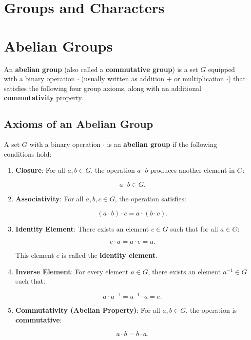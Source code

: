 \documentclass[11pt]{article}
\theoremstyle{definition}
\begin{document}
\section*{Groups and Characters}

\section{Abelian Groups}

An \textbf{abelian group} (also called a \textbf{commutative group}) is a set \( G \) equipped with a binary operation \( \cdot \) (usually written as addition \( + \) or multiplication \( \cdot \)) that satisfies the following four group axioms, along with an additional \textbf{commutativity} property.

\subsection{Axioms of an Abelian Group}
A set \( G \) with a binary operation \( \cdot \) is an \textbf{abelian group} if the following conditions hold:

\begin{enumerate}
    \item \textbf{Closure}:  
    For all \( a, b \in G \), the operation \( a \cdot b \) produces another element in \( G \):

    \[
    a \cdot b \in G.
    \]

    \item \textbf{Associativity}:  
    For all \( a, b, c \in G \), the operation satisfies:

    \[
    (a \cdot b) \cdot c = a \cdot (b \cdot c).
    \]

    \item \textbf{Identity Element}:  
    There exists an element \( e \in G \) such that for all \( a \in G \):

    \[
    e \cdot a = a \cdot e = a.
    \]

    This element \( e \) is called the \textbf{identity element}.

    \item \textbf{Inverse Element}:  
    For every element \( a \in G \), there exists an element \( a^{-1} \in G \) such that:

    \[
    a \cdot a^{-1} = a^{-1} \cdot a = e.
    \]

    \item \textbf{Commutativity (Abelian Property)}:  
    For all \( a, b \in G \), the operation is \textbf{commutative}:

    \[
    a \cdot b = b \cdot a.
    \]

\end{enumerate}
\end{document}
